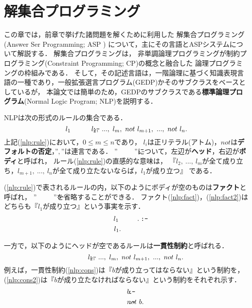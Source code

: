\chapter{解集合プログラミング}\label{chap:asp}
この章では，前章で挙げた諸問題を解くために利用した
解集合プログラミング(Answer Ser Programming; ASP
\cite{%
  Hayama17,%
  Inoue08}
)
について，主にその言語とASPシステムについて解説する．
解集合プログラミングは，
非単調論理プログラミングが制約プログラミング(Constraint Programming; CP)の概念と融合した
論理プログラミングの枠組みである．\cite{Inoue08}
そして，その記述言語は，一階論理に基づく知識表現言語の一種であり，一般拡張選言プログラム(GEDP)かそのサブクラスをベースとしているが，
本論文では簡単のため，GEDPのサブクラスである\textbf{標準論理プログラム}(Normal Logic Program; NLP)を説明する．

NLPは次の形式のルールの集合である．\\
\begin{equation}
  \label{nlp:rule}
l_1 ~\mcode{:-} ~l_2, ~..., ~l_m, ~not ~l_{m+1}, ~..., ~not ~l_{n}.
\end{equation}
上記(\ref{nlp:rule})において，$0 \leq m \leq n$であり，
$l_i$は正リテラル(アトム)，$not$は\textbf{デフォルトの否定}\cite{Sakama10}，”$,$”は連言である．
”$\mcode{:-}$”について，左辺が\textbf{ヘッド}，右辺が\textbf{ボディ}と呼ばれ，
ルール(\ref{nlp:rule})の直感的な意味は，
『$l_2, ~..., ~l_m$が全て成り立ち，$l_{m+1}, ~..., ~l_{n}$が全て成り立たないならば，$l_1$が成り立つ』
である．

(\ref{nlp:rule})で表されるルールの内，以下のようにボディが空のものは\textbf{ファクト}と呼ばれ，
”$\mcode{:-}$”を省略することができる．
ファクト(\ref{nlp:fact})，(\ref{nlp:fact2})はどちらも『$l_1$が成り立つ』という事実を示す．
\begin{eqnarray}
  \label{nlp:fact}
   l_1 ~&\mcode{:-}. \\
  \label{nlp:fact2}
   l_1.&
\end{eqnarray}

一方で，以下のようにヘッドが空であるルールは\textbf{一貫性制約}と呼ばれる．
\begin{equation}
  \mcode{:-} ~l_2, ~..., ~l_m, ~not ~l_{m+1}, ~..., ~not ~l_{n}.
\end{equation}
例えば，一貫性制約(\ref{nlp:cons})は『$b$が成り立ってはならない』という制約を，
(\ref{nlp:cons2})は『$b$が成り立たなければならない』という制約をそれぞれ示す．
\begin{eqnarray}
  \label{nlp:cons}
   \mcode{:-}& ~b.\\
  \label{nlp:cons2}
   \mcode{:-}& ~not ~b.
\end{eqnarray}

